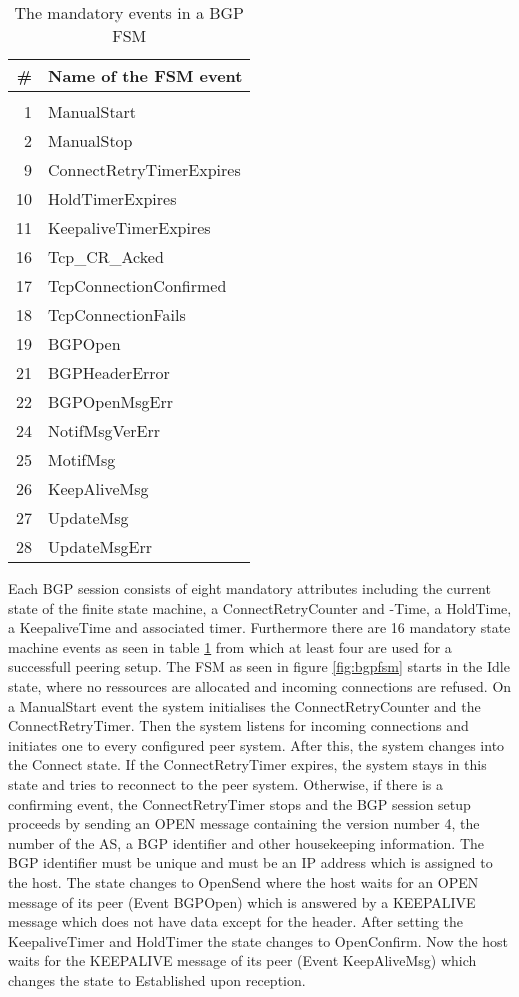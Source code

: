 \documentclass{acm_proc_article-sp}
\begin{document}
\begin{table}
\centering
    \begin{tabular}{r l}
    \# & Name of the FSM event    \\
    \hline                        \\
    1  & ManualStart              \\
    2  & ManualStop               \\
    9  & ConnectRetryTimerExpires \\
    10 & HoldTimerExpires         \\
    11 & KeepaliveTimerExpires    \\
    16 & Tcp\_CR\_Acked           \\
    17 & TcpConnectionConfirmed   \\
    18 & TcpConnectionFails       \\
    19 & BGPOpen                  \\
    21 & BGPHeaderError           \\
    22 & BGPOpenMsgErr            \\
    24 & NotifMsgVerErr           \\
    25 & MotifMsg                 \\
    26 & KeepAliveMsg             \\
    27 & UpdateMsg                \\
    28 & UpdateMsgErr             \\
    \end{tabular}
\caption{The mandatory events in a BGP FSM}
\label{tab:bgpfsmevent}
\end{table}

Each BGP session consists of eight mandatory attributes including the current state of the finite state machine, a ConnectRetryCounter and -Time, a HoldTime, a KeepaliveTime and associated timer. Furthermore there are 16 mandatory state machine events as seen in table \ref{tab:bgpfsmevent} from which at least four are used for a successfull peering setup. The FSM as seen in figure \ref{fig:bgpfsm} starts in the Idle state, where no ressources are allocated and incoming connections are refused. On a ManualStart event the system initialises the ConnectRetryCounter and the ConnectRetryTimer. Then the system listens for incoming connections and initiates one to every configured peer system. After this, the system changes into the Connect state. If the ConnectRetryTimer expires, the system stays in this state and tries to reconnect to the peer system. Otherwise, if there is a confirming event, the ConnectRetryTimer stops and the BGP session setup proceeds by sending an OPEN message containing the version number 4, the number of the AS, a BGP identifier and other housekeeping information. The BGP identifier must be unique and must be an IP address which is assigned to the host. The state changes to OpenSend where the host waits for an OPEN message of its peer (Event BGPOpen) which is answered by a KEEPALIVE message which does not have data except for the header. After setting the KeepaliveTimer and HoldTimer the state changes to OpenConfirm. Now the host waits for the KEEPALIVE message of its peer (Event KeepAliveMsg) which changes the state to Established upon reception.
\end{document}

